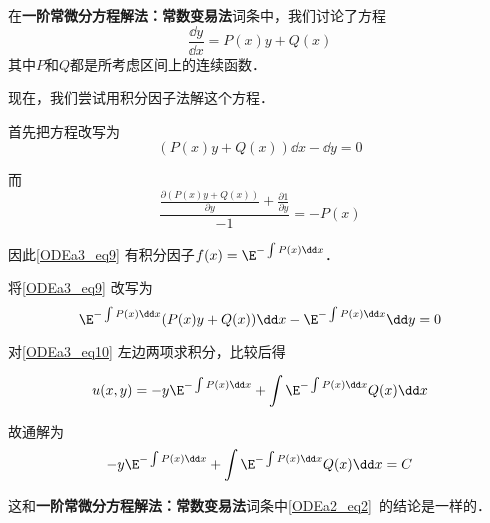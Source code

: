 \begin{example}{}
在\textbf{一阶常微分方程解法：常数变易法}词条中，我们讨论了方程
\begin{equation}
\frac{\dd y}{\dd x}=P(x)y+Q(x)
\end{equation}
其中$P$和$Q$都是所考虑区间上的连续函数．

现在，我们尝试用积分因子法解这个方程．

首先把方程改写为
\begin{equation}\label{ODEa3_eq9}
(P(x)y+Q(x))\dd x-\dd y=0
\end{equation}

而
\begin{equation}
\frac{\frac{\partial (P(x)y+Q(x))}{\partial y}+\frac{\partial 1}{\partial y}}{-1}=-P(x)
\end{equation}

因此\autoref{ODEa3_eq9} 有积分因子$f(x)=\E^{-\int P(x)\dd x}
$．

将\autoref{ODEa3_eq9} 改写为
\begin{equation}\label{ODEa3_eq10}
\E^{-\int P(x)\dd x}(P(x)y+Q(x))\dd x-\E^{-\int P(x)\dd x}\dd y=0
\end{equation}

对\autoref{ODEa3_eq10} 左边两项求积分，比较后得

\begin{equation}
u(x, y)=-y\E^{-\int P(x)\dd x}+\int  \E^{-\int P(x)\dd x}Q(x)  \dd x
\end{equation}

故通解为
\begin{equation}
-y\E^{-\int P(x)\dd x}+\int  \E^{-\int P(x)\dd x}Q(x)  \dd x=C
\end{equation}

这和\textbf{一阶常微分方程解法：常数变易法}词条中\autoref{ODEa2_eq2}~的结论是一样的．

\end{example}














